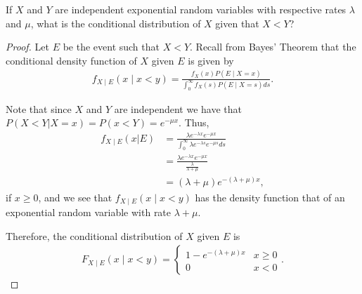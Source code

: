 \begin{problem}{5.8}
  If $X$ and $Y$ are independent exponential random variables with respective rates
  $\lambda$ and $\mu$, what is the conditional distribution of $X$ given that $X < Y$?
\end{problem}

\begin{proof}
  Let $E$ be the event such that $X < Y$. Recall from Bayes' Theorem that the conditional density function
  of $X$ given $E$ is given by
  \begin{align*}
    f_{X\mid E}(x\mid  x < y) = \frac{f_X(x)P(E \mid X=x)}{\int_0^\infty f_X(s)P(E\mid X=s) ds }.
  \end{align*}

  Note that since $X$ and $Y$ are independent we have that
  $P(X < Y | X = x) = P(x < Y) = e^{-\mu x}$. Thus,
  \begin{align*}
    f_{X\mid E}(x|E) &= \frac{\lambda e^{-\lambda x} e^{-\mu x}}{\int_{0}^\infty \lambda e^{-\lambda s} e^{-\mu s} ds}\\
    &= \frac{\lambda e^{-\lambda x} e^{-\mu x}}{\frac{\lambda}{\lambda + \mu}} \\
    &= (\lambda + \mu) e^{-(\lambda + \mu)x},
  \end{align*}
  if $x \geq 0$, and we see that $f_{X\mid E}(x\mid x < y)$ has the density function that
  of an exponential random variable with rate $\lambda + \mu$.

  Therefore, the conditional distribution of $X$ given $E$ is
  \begin{align*}
    F_{X\mid E}(x \mid x < y ) =
    \begin{cases}
      1 - e^{-(\lambda + \mu) x} & x \geq 0 \\
      0 & x < 0
    \end{cases}.
  \end{align*}
\end{proof}
\newpage
